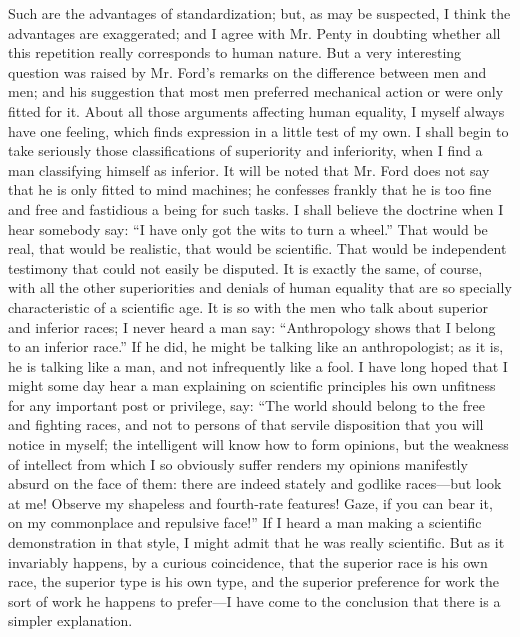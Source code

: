 \documentclass{book}
\begin{document}
Such are the advantages of standardization; but, as may be suspected, I think the advantages are exaggerated; and I agree with Mr. Penty in doubting whether all this repetition really corresponds to human nature. But a very interesting question was raised by Mr. Ford’s remarks on the difference between men and men; and his suggestion that most men preferred mechanical action or were only fitted for it. About all those arguments affecting human equality, I myself always have one feeling, which finds expression in a little test of my own. I shall begin to take seriously those classifications of superiority and inferiority, when I find a man classifying himself as inferior. It will be noted that Mr. Ford does not say that he is only fitted to mind machines; he confesses frankly that he is too fine and free and fastidious a being for such tasks. I shall believe the doctrine when I hear somebody say: “I have only got the wits to turn a wheel.” That would be real, that would be realistic, that would be scientific. That would be independent testimony that could not easily be disputed. It is exactly the same, of course, with all the other superiorities and denials of human equality that are so specially characteristic of a scientific age. It is so with the men who talk about superior and inferior races; I never heard a man say: “Anthropology shows that I belong to an inferior race.” If he did, he might be talking like an anthropologist; as it is, he is talking like a man, and not infrequently like a fool. I have long hoped that I might some day hear a man explaining on scientific principles his own unfitness for any important post or privilege, say: “The world should belong to the free and fighting races, and not to persons of that servile disposition that you will notice in myself; the intelligent will know how to form opinions, but the weakness of intellect from which I so obviously suffer renders my opinions manifestly absurd on the face of them: there are indeed stately and godlike races—but look at me! Observe my shapeless and fourth-rate features! Gaze, if you can bear it, on my commonplace and repulsive face!” If I heard a man making a scientific demonstration in that style, I might admit that he was really scientific. But as it invariably happens, by a curious coincidence, that the superior race is his own race, the superior type is his own type, and the superior preference for work the sort of work he happens to prefer—I have come to the conclusion that there is a simpler explanation.
\end{document}
